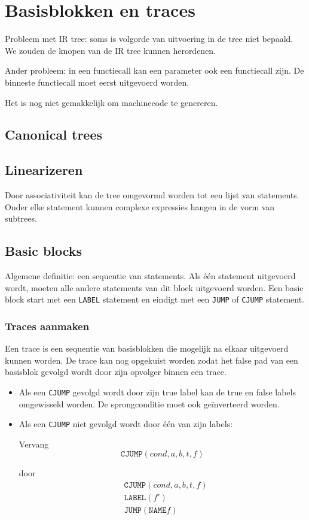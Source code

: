 \chapter{Basisblokken en traces}

Probleem met IR tree: soms is volgorde van uitvoering in de tree niet bepaald. We zouden de knopen van de IR tree kunnen herordenen.

Ander probleem: in een functiecall kan een parameter ook een functiecall zijn. De binneste functiecall moet eerst uitgevoerd worden.

Het is nog niet gemakkelijk om machinecode te genereren.


\section{Canonical trees}


\section{Linearizeren}
Door associativiteit kan de tree omgevormd worden tot een lijst van statements. Onder elke statement kunnen complexe expressies hangen in de vorm van subtrees.



\section{Basic blocks}
Algemene definitie: een sequentie van statements. Als één statement uitgevoerd wordt, moeten alle andere statements van dit block uitgevoerd worden. Een basic block start met een \texttt{LABEL} statement en eindigt met een \texttt{JUMP} of \texttt{CJUMP} statement.

\subsection{Traces aanmaken}
Een trace is een sequentie van basisblokken die mogelijk na elkaar uitgevoerd kunnen worden. De trace kan nog opgekuist worden zodat het false pad van een basisblok gevolgd wordt door zijn opvolger binnen een trace. 
\begin{itemize}
	\item Als een \texttt{CJUMP} gevolgd wordt door zijn true label kan de true en false labels omgewisseld worden. De sprongconditie moet ook geïnverteerd worden.
	\item Als een \texttt{CJUMP} niet gevolgd wordt door één van zijn labels:
	
	Vervang $$\texttt{CJUMP}(cond, a, b, t, f)$$
	
	door
	\begin{align*}
		& \texttt{CJUMP}(cond, a, b, t, f) \\
		& \texttt{LABEL}(f') \\
		& \texttt{JUMP}(\texttt{NAME} f) \\
	\end{align*}
\end{itemize}

